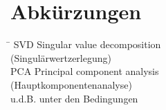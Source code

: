 \chapter*{Abkürzungen}
\begin{tabbing}
    \hspace{4cm} \= \kill
    SVD \>  Singular value decomposition\\
        \>  (Singulärwertzerlegung) \\[6pt] 
    PCA \> Principal component analysis\\
        \> (Hauptkomponentenanalyse) \\[6pt] 
    u.d.B. \>  unter den Bedingungen \\
\end{tabbing}